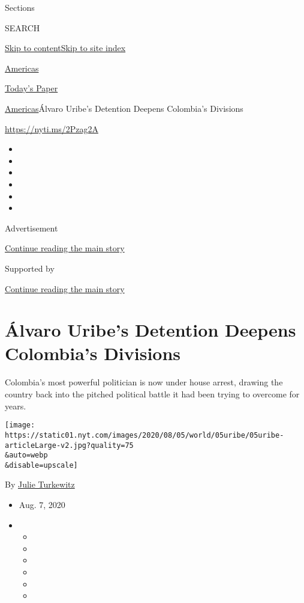 Sections

SEARCH

\protect\hyperlink{site-content}{Skip to
content}\protect\hyperlink{site-index}{Skip to site index}

\href{https://www.nytimes.com/section/world/americas}{Americas}

\href{https://myaccount.nytimes.com/auth/login?response_type=cookie\&client_id=vi}{}

\href{https://www.nytimes.com/section/todayspaper}{Today's Paper}

\href{/section/world/americas}{Americas}\textbar{}Álvaro Uribe's
Detention Deepens Colombia's Divisions

\href{https://nyti.ms/2Pzag2A}{https://nyti.ms/2Pzag2A}

\begin{itemize}
\item
\item
\item
\item
\item
\item
\end{itemize}

Advertisement

\protect\hyperlink{after-top}{Continue reading the main story}

Supported by

\protect\hyperlink{after-sponsor}{Continue reading the main story}

\hypertarget{uxe1lvaro-uribes-detention-deepens-colombias-divisions}{%
\section{Álvaro Uribe's Detention Deepens Colombia's
Divisions}\label{uxe1lvaro-uribes-detention-deepens-colombias-divisions}}

Colombia's most powerful politician is now under house arrest, drawing
the country back into the pitched political battle it had been trying to
overcome for years.

\texttt{[image: https://static01.nyt.com/images/2020/08/05/world/05uribe/05uribe-articleLarge-v2.jpg?quality=75\\\&auto=webp\\\&disable=upscale]}

By \href{https://www.nytimes.com/by/julie-turkewitz}{Julie Turkewitz}

\begin{itemize}
\item
  Aug. 7, 2020
\item
  \begin{itemize}
  \item
  \item
  \item
  \item
  \item
  \item
  \end{itemize}
\end{itemize}

